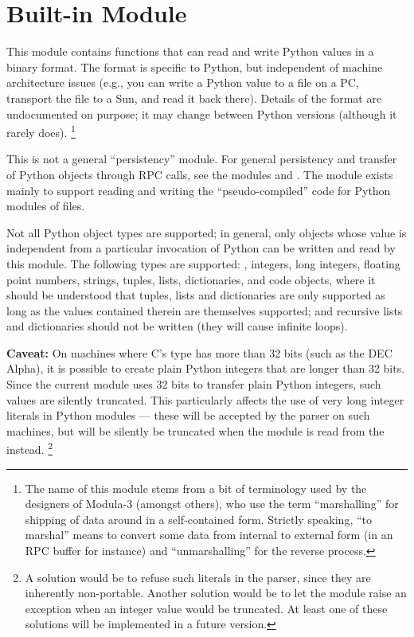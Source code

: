 \section{Built-in Module }
\label{module-marshal}

This module contains functions that can read and write Python
values in a binary format.  The format is specific to Python, but
independent of machine architecture issues (e.g., you can write a
Python value to a file on a PC, transport the file to a Sun, and read
it back there).  Details of the format are undocumented on purpose;
it may change between Python versions (although it rarely does).%
\footnote{The name of this module stems from a bit of terminology used
by the designers of Modula-3 (amongst others), who use the term
``marshalling'' for shipping of data around in a self-contained form.
Strictly speaking, ``to marshal'' means to convert some data from
internal to external form (in an RPC buffer for instance) and
``unmarshalling'' for the reverse process.}

This is not a general ``persistency'' module.  For general persistency
and transfer of Python objects through RPC calls, see the modules
 and .  The  module exists
mainly to support reading and writing the ``pseudo-compiled'' code for
Python modules of  files.

Not all Python object types are supported; in general, only objects
whose value is independent from a particular invocation of Python can
be written and read by this module.  The following types are supported:
, integers, long integers, floating point numbers,
strings, tuples, lists, dictionaries, and code objects, where it
should be understood that tuples, lists and dictionaries are only
supported as long as the values contained therein are themselves
supported; and recursive lists and dictionaries should not be written
(they will cause infinite loops).

{\bf Caveat:} On machines where C's  type has more than
32 bits (such as the DEC Alpha), it
is possible to create plain Python integers that are longer than 32
bits.  Since the current  module uses 32 bits to
transfer plain Python integers, such values are silently truncated.
This particularly affects the use of very long integer literals in
Python modules --- these will be accepted by the parser on such
machines, but will be silently be truncated when the module is read
from the  instead.%
\footnote{A solution would be to refuse such literals in the parser,
since they are inherently non-portable.  Another solution would be to
let the  module raise an exception when an integer value
would be truncated.  At least one of these solutions will be
implemented in a future version.}

